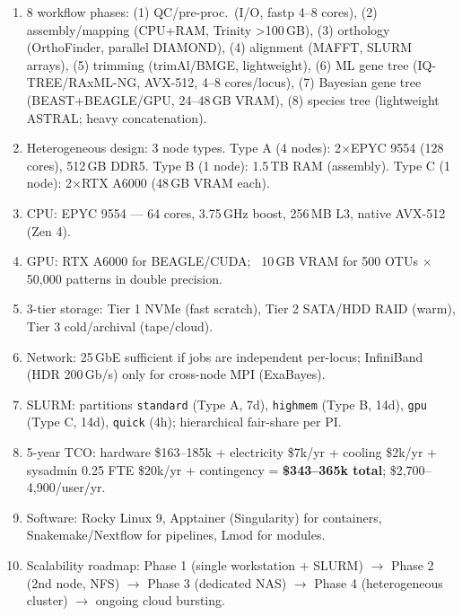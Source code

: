 \clearpage
\begin{revise}\small
\begin{enumerate}[itemsep=0pt, topsep=0pt, parsep=0pt]
    \item 8 workflow phases: (1) QC/pre-proc.\ (I/O, fastp 4--8 cores), (2) assembly/mapping (CPU+RAM, Trinity >100\,GB), (3) orthology (OrthoFinder, parallel DIAMOND), (4) alignment (MAFFT, SLURM arrays), (5) trimming (trimAl/BMGE, lightweight), (6) ML gene tree (IQ-TREE/RAxML-NG, AVX-512, 4--8 cores/locus), (7) Bayesian gene tree (BEAST+BEAGLE/GPU, 24--48\,GB VRAM), (8) species tree (lightweight ASTRAL; heavy concatenation).
    \item Heterogeneous design: 3 node types. Type A (4 nodes): 2$\times$EPYC 9554 (128 cores), 512\,GB DDR5. Type B (1 node): 1.5\,TB RAM (assembly). Type C (1 node): 2$\times$RTX A6000 (48\,GB VRAM each).
    \item CPU: EPYC 9554 --- 64 cores, 3.75\,GHz boost, 256\,MB L3, native AVX-512 (Zen 4).
    \item GPU: RTX A6000 for BEAGLE/CUDA; ~10\,GB VRAM for 500 OTUs $\times$ 50,000 patterns in double precision.
    \item 3-tier storage: Tier 1 NVMe (fast scratch), Tier 2 SATA/HDD RAID (warm), Tier 3 cold/archival (tape/cloud).
    \item Network: 25\,GbE sufficient if jobs are independent per-locus; InfiniBand (HDR 200\,Gb/s) only for cross-node MPI (ExaBayes).
    \item SLURM: partitions \texttt{standard} (Type A, 7d), \texttt{highmem} (Type B, 14d), \texttt{gpu} (Type C, 14d), \texttt{quick} (4h); hierarchical fair-share per PI.
    \item 5-year TCO: hardware \$163--185k + electricity \$7k/yr + cooling \$2k/yr + sysadmin 0.25 FTE \$20k/yr + contingency = \textbf{\$343--365k total}; \$2,700--4,900/user/yr.
    \item Software: Rocky Linux 9, Apptainer (Singularity) for containers, Snakemake/Nextflow for pipelines, Lmod for modules.
    \item Scalability roadmap: Phase 1 (single workstation + SLURM) $\to$ Phase 2 (2nd node, NFS) $\to$ Phase 3 (dedicated NAS) $\to$ Phase 4 (heterogeneous cluster) $\to$ ongoing cloud bursting.
\end{enumerate}
\end{revise}

\clearpage

\printbibliography[heading=subbibliography,title={References}]

